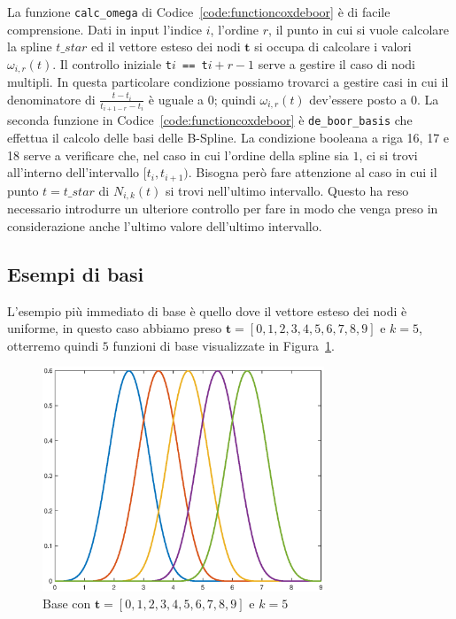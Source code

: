 \documentclass[a4paper, 10pt]{article}
\begin{document}
La funzione \texttt{calc\_omega} di Codice~\ref{code:functioncoxdeboor} è di facile comprensione. Dati in input
l'indice $i$, l'ordine $r$, il punto in cui si vuole calcolare la spline $t\_star$ ed il vettore esteso dei nodi $\mathbf{t}$ si occupa di calcolare i valori $\omega_{i, r}(t)$.
Il controllo iniziale \texttt{t\( i \) == t\( i+r-1 \)} serve a gestire il caso di nodi multipli. In questa particolare condizione possiamo trovarci a gestire casi in cui il denominatore di $\frac{t - t_i}{t_{i+1-r}-t_i}$ è uguale a $0$; quindi
$\omega_{i,r}(t)$ dev'essere posto a $0$. 
La seconda funzione in Codice~\ref{code:functioncoxdeboor} è \texttt{de\_boor\_basis} che effettua il calcolo delle basi delle B-Spline. 
La condizione booleana a riga 16, 17 e 18 serve a verificare che, nel caso 
in cui l'ordine della spline sia $1$, ci si trovi all'interno dell'intervallo $[t_i, t_{i+1} )$. Bisogna però fare attenzione al caso in cui 
il punto $t = t\_star$ di $N_{i, k}(t)$ si trovi nell'ultimo intervallo. Questo ha reso necessario introdurre un ulteriore controllo per fare in modo che venga 
preso in considerazione anche l'ultimo valore dell'ultimo intervallo.
\subsection{Esempi di basi}
L'esempio più immediato di base è quello dove il vettore esteso dei nodi è uniforme, in questo caso abbiamo preso $\mathbf{t} = [0, 1, 2, 3, 4, 5, 6, 7, 8, 9]$ e $k = 5$, otterremo quindi $5$
funzioni di base visualizzate in Figura~\ref{fig:first_basis}.
\begin{figure}[]
  \centering
  \includegraphics[width=0.75\textwidth]{figure/uniform_not_multiple_basis.eps}
  \caption{Base con $\mathbf{t} = [0, 1, 2, 3, 4, 5, 6, 7, 8, 9]$ e $k = 5$}
  \label{fig:first_basis}
\end{figure} 
\end{document}
